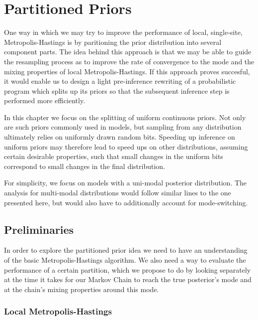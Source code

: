 \chapter{Partitioned Priors}

One way in which we may try to improve the performance of local, single-site, Metropolis-Hastings is by paritioning the prior distribution into several component parts. The idea behind this approach is that we may be able to guide the resampling process as to improve the rate of convergence to the mode and the mixing properties of local Metropolis-Hastings.  If this approach proves succesful, it would enable us to design a light pre-inference rewriting of a probabilistic program which splits up its priors so that the subsequent inference step is performed more efficiently.

In this chapter we focus on the splitting of uniform continuous priors. Not only are such priors commonly used in models, but sampling from any distribution ultimately relies on uniformly drawn random bits. Speeding up inference on uniform priors may therefore lead to speed ups on other distributions, assuming certain desirable properties, such that small changes in the uniform bits correspond to small changes in the final distribution. 

For simplicity, we focus on models with a uni-modal posterior distribution. The analysis for multi-modal distributions would follow similar lines to the one presented here, but would also have to additionally account for mode-switching.

\section{Preliminaries}

In order to explore the partitioned prior idea we need to have an understanding of the basic Metropolis-Hastings algorithm. We also need a way to evaluate the performance of a certain partition, which we propose to do by looking separately at the time it takes for our Markov Chain to reach the true posterior's mode and at the chain's mixing properties around this mode.

\subsection{Local Metropolis-Hastings}

